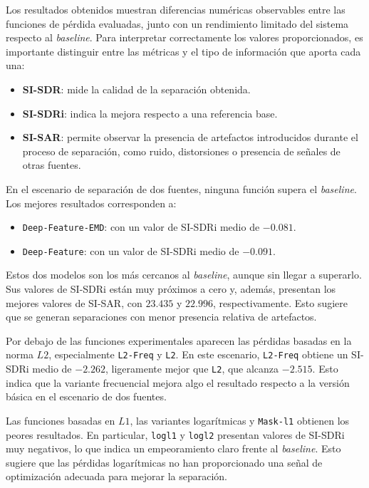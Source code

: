 Los resultados obtenidos muestran diferencias numéricas observables entre las funciones de pérdida evaluadas, junto con un rendimiento limitado del sistema respecto al \textit{baseline}. Para interpretar correctamente los valores proporcionados, es importante distinguir entre las métricas y el tipo de información que aporta cada una:

\begin{itemize}
\item \textbf{SI-SDR}: mide la calidad de la separación obtenida.

\item \textbf{SI-SDRi}: indica la mejora respecto a una referencia base.

\item \textbf{SI-SAR}: permite observar la presencia de artefactos introducidos durante el proceso de separación, como ruido, distorsiones o presencia de señales de otras fuentes.

\end{itemize}

En el escenario de separación de dos fuentes, ninguna función supera el \textit{baseline}. Los mejores resultados corresponden a:

\begin{itemize}
\item \texttt{Deep-Feature-EMD}: con un valor de SI-SDRi medio de \(-0.081\).

\item \texttt{Deep-Feature}: con un valor de SI-SDRi medio de \(-0.091\).

\end{itemize}

Estos dos modelos son los más cercanos al \textit{baseline}, aunque sin llegar a superarlo. Sus valores de SI-SDRi están muy próximos a cero y, además, presentan los mejores valores de SI-SAR, con \(23.435\) y \(22.996\), respectivamente. Esto sugiere que se generan separaciones con menor presencia relativa de artefactos.

Por debajo de las funciones experimentales aparecen las pérdidas basadas en la norma \(L2\), especialmente \texttt{L2-Freq} y \texttt{L2}. En este escenario, \texttt{L2-Freq} obtiene un SI-SDRi medio de \(-2.262\), ligeramente mejor que \texttt{L2}, que alcanza \(-2.515\). Esto indica que la variante frecuencial mejora algo el resultado respecto a la versión básica en el escenario de dos fuentes.

Las funciones basadas en \(L1\), las variantes logarítmicas y \texttt{Mask-l1} obtienen los peores resultados. En particular, \texttt{logl1} y \texttt{logl2} presentan valores de SI-SDRi muy negativos, lo que indica un empeoramiento claro frente al \textit{baseline}. Esto sugiere que las pérdidas logarítmicas no han proporcionado una señal de optimización adecuada para mejorar la separación.

